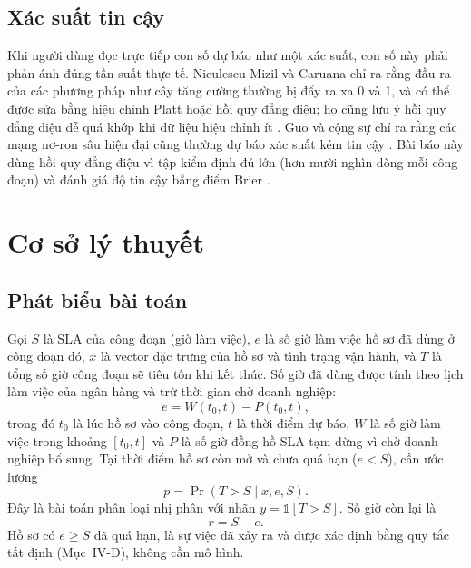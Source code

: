 \documentclass[journal]{IEEEtran}
\begin{document}
\subsection{Xác suất tin cậy}
Khi người dùng đọc trực tiếp con số dự báo như một xác suất, con số này phải phản ánh đúng tần suất thực tế. Niculescu-Mizil và Caruana chỉ ra rằng đầu ra của các phương pháp như cây tăng cường thường bị đẩy ra xa 0 và 1, và có thể được sửa bằng hiệu chỉnh Platt hoặc hồi quy đẳng điệu; họ cũng lưu ý hồi quy đẳng điệu dễ quá khớp khi dữ liệu hiệu chỉnh ít \cite{niculescu2005}. Guo và cộng sự chỉ ra rằng các mạng nơ-ron sâu hiện đại cũng thường dự báo xác suất kém tin cậy \cite{guo2017}. Bài báo này dùng hồi quy đẳng điệu vì tập kiểm định đủ lớn (hơn mười nghìn dòng mỗi công đoạn) và đánh giá độ tin cậy bằng điểm Brier \cite{brier1950}.


\section{Cơ sở lý thuyết}
\subsection{Phát biểu bài toán}
Gọi $S$ là SLA của công đoạn (giờ làm việc), $e$ là số giờ làm việc hồ sơ đã dùng ở công đoạn đó, $x$ là vector đặc trưng của hồ sơ và tình trạng vận hành, và $T$ là tổng số giờ công đoạn sẽ tiêu tốn khi kết thúc. Số giờ đã dùng được tính theo lịch làm việc của ngân hàng và trừ thời gian chờ doanh nghiệp:
\begin{equation}
e=W(t_0,t)-P(t_0,t),
\end{equation}
trong đó $t_0$ là lúc hồ sơ vào công đoạn, $t$ là thời điểm dự báo, $W$ là số giờ làm việc trong khoảng $[t_0,t]$ và $P$ là số giờ đồng hồ SLA tạm dừng vì chờ doanh nghiệp bổ sung. Tại thời điểm hồ sơ còn mở và chưa quá hạn ($e<S$), cần ước lượng
\begin{equation}
p=\Pr(T>S\mid x,e,S).
\end{equation}
Đây là bài toán phân loại nhị phân với nhãn $y=\mathbb{1}[T>S]$. Số giờ còn lại là
\begin{equation}
r=S-e.
\end{equation}
Hồ sơ có $e\ge S$ đã quá hạn, là sự việc đã xảy ra và được xác định bằng quy tắc tất định (Mục~IV-D), không cần mô hình.
\end{document}
